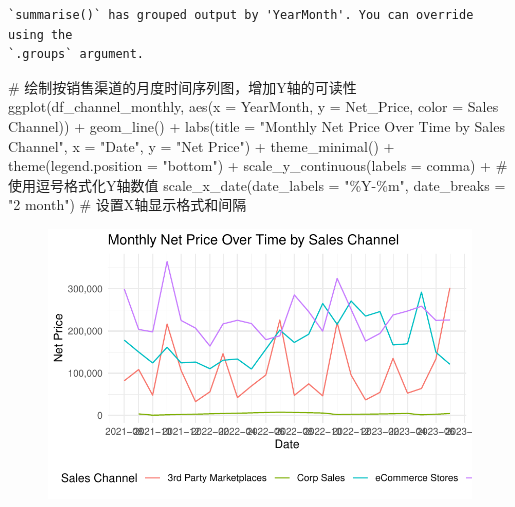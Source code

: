 \documentclass[
  letterpaper,
  DIV=11,
  numbers=noendperiod]{scrartcl}
\newenvironment{Shaded}{\begin{snugshade}}{\end{snugshade}}
\newcommand{\AttributeTok}[1]{\textcolor[rgb]{0.40,0.45,0.13}{#1}}
\newcommand{\CommentTok}[1]{\textcolor[rgb]{0.37,0.37,0.37}{#1}}
\newcommand{\FunctionTok}[1]{\textcolor[rgb]{0.28,0.35,0.67}{#1}}
\newcommand{\NormalTok}[1]{\textcolor[rgb]{0.00,0.23,0.31}{#1}}
\newcommand{\SpecialCharTok}[1]{\textcolor[rgb]{0.37,0.37,0.37}{#1}}
\newcommand{\StringTok}[1]{\textcolor[rgb]{0.13,0.47,0.30}{#1}}
\begin{document}
\begin{verbatim}
`summarise()` has grouped output by 'YearMonth'. You can override using the
`.groups` argument.
\end{verbatim}

\begin{Shaded}
\begin{Highlighting}[]
\CommentTok{\# 绘制按销售渠道的月度时间序列图，增加Y轴的可读性}
\FunctionTok{ggplot}\NormalTok{(df\_channel\_monthly, }\FunctionTok{aes}\NormalTok{(}\AttributeTok{x =}\NormalTok{ YearMonth, }\AttributeTok{y =}\NormalTok{ Net\_Price, }\AttributeTok{color =} \StringTok{\textasciigrave{}}\AttributeTok{Sales Channel}\StringTok{\textasciigrave{}}\NormalTok{)) }\SpecialCharTok{+}
  \FunctionTok{geom\_line}\NormalTok{() }\SpecialCharTok{+}
  \FunctionTok{labs}\NormalTok{(}\AttributeTok{title =} \StringTok{"Monthly Net Price Over Time by Sales Channel"}\NormalTok{,}
       \AttributeTok{x =} \StringTok{"Date"}\NormalTok{, }\AttributeTok{y =} \StringTok{"Net Price"}\NormalTok{) }\SpecialCharTok{+}
  \FunctionTok{theme\_minimal}\NormalTok{() }\SpecialCharTok{+}
  \FunctionTok{theme}\NormalTok{(}\AttributeTok{legend.position =} \StringTok{"bottom"}\NormalTok{) }\SpecialCharTok{+}
  \FunctionTok{scale\_y\_continuous}\NormalTok{(}\AttributeTok{labels =}\NormalTok{ comma) }\SpecialCharTok{+}  \CommentTok{\# 使用逗号格式化Y轴数值}
  \FunctionTok{scale\_x\_date}\NormalTok{(}\AttributeTok{date\_labels =} \StringTok{"\%Y{-}\%m"}\NormalTok{, }\AttributeTok{date\_breaks =} \StringTok{"2 month"}\NormalTok{)  }\CommentTok{\# 设置X轴显示格式和间隔}
\end{Highlighting}
\end{Shaded}

\begin{figure}[H]

{\centering \includegraphics{Time-Serise-EDA_files/figure-pdf/unnamed-chunk-9-1.pdf}

}

\end{figure}
\end{document}
